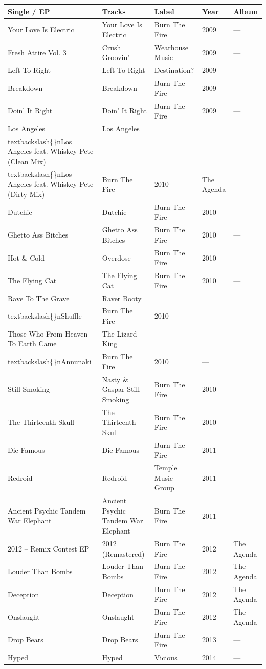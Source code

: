 \documentclass{article}
\begin{document}
\begin{tabular}{lllll}
\toprule
Single / EP & Tracks & Label & Year & Album \\
\midrule
Your Love Is Electric & Your Love Is Electric & Burn The Fire & 2009 & — \\
Fresh Attire Vol. 3 & Crush Groovin' & Wearhouse Music & 2009 & — \\
Left To Right & Left To Right & Destination? & 2009 & — \\
Breakdown & Breakdown & Burn The Fire & 2009 & — \\
Doin' It Right & Doin' It Right & Burn The Fire & 2009 & — \\
Los Angeles & Los Angeles\\textbackslash\{\}nLos Angeles feat. Whiskey Pete (Clean Mix)\\textbackslash\{\}nLos Angeles feat. Whiskey Pete (Dirty Mix) & Burn The Fire & 2010 & The Agenda \\
Dutchie & Dutchie & Burn The Fire & 2010 & — \\
Ghetto Ass Bitches & Ghetto Ass Bitches & Burn The Fire & 2010 & — \\
Hot \& Cold & Overdose & Burn The Fire & 2010 & — \\
The Flying Cat & The Flying Cat & Burn The Fire & 2010 & — \\
Rave To The Grave & Raver Booty\\textbackslash\{\}nShuffle & Burn The Fire & 2010 & — \\
Those Who From Heaven To Earth Came & The Lizard King\\textbackslash\{\}nAnnunaki & Burn The Fire & 2010 & — \\
Still Smoking & Nasty \& Gaspar Still Smoking & Burn The Fire & 2010 & — \\
The Thirteenth Skull & The Thirteenth Skull & Burn The Fire & 2010 & — \\
Die Famous & Die Famous & Burn The Fire & 2011 & — \\
Redroid & Redroid & Temple Music Group & 2011 & — \\
Ancient Psychic Tandem War Elephant & Ancient Psychic Tandem War Elephant & Burn The Fire & 2011 & — \\
2012 – Remix Contest EP & 2012 (Remastered) & Burn The Fire & 2012 & The Agenda \\
Louder Than Bombs & Louder Than Bombs & Burn The Fire & 2012 & The Agenda \\
Deception & Deception & Burn The Fire & 2012 & The Agenda \\
Onslaught & Onslaught & Burn The Fire & 2012 & The Agenda \\
Drop Bears & Drop Bears & Burn The Fire & 2013 & — \\
Hyped & Hyped & Vicious & 2014 & — \\
\bottomrule
\end{tabular}
\end{document}
